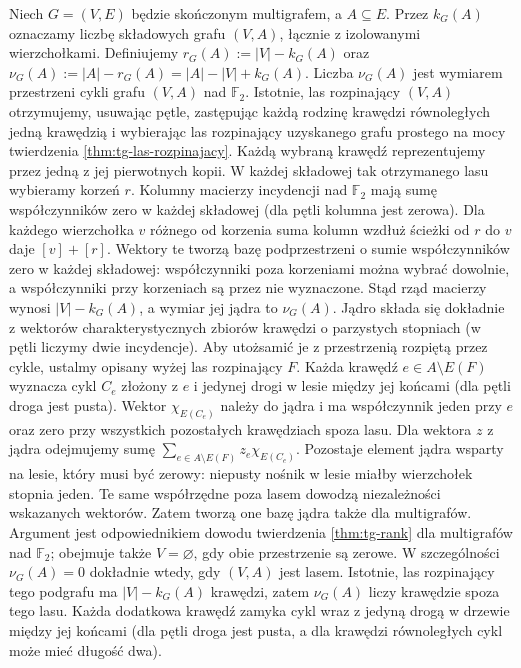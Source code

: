 \begin{definicja}
Niech $G=(V,E)$ będzie skończonym multigrafem, a $A\subseteq E$.
Przez $k_G(A)$ oznaczamy liczbę składowych grafu $(V,A)$,
łącznie z izolowanymi wierzchołkami. Definiujemy
$r_G(A):=|V|-k_G(A)$ oraz
$\nu_G(A):=|A|-r_G(A)=|A|-|V|+k_G(A)$.
Liczba $\nu_G(A)$ jest wymiarem przestrzeni cykli grafu $(V,A)$
nad $\mathbb F_2$. Istotnie, las rozpinający $(V,A)$
otrzymujemy, usuwając pętle, zastępując każdą rodzinę
krawędzi równoległych jedną krawędzią i wybierając las
rozpinający uzyskanego grafu prostego na mocy twierdzenia
\ref{thm:tg-las-rozpinajacy}. Każdą wybraną krawędź
reprezentujemy przez jedną z jej pierwotnych kopii.
W każdej składowej tak otrzymanego lasu wybieramy korzeń $r$. Kolumny macierzy
incydencji nad $\mathbb F_2$ mają sumę współczynników
zero w każdej składowej (dla pętli kolumna jest zerowa).
Dla każdego wierzchołka $v$ różnego od korzenia suma
kolumn wzdłuż ścieżki od $r$ do $v$ daje $[v]+[r]$.
Wektory te tworzą bazę podprzestrzeni o sumie
współczynników zero w każdej składowej: współczynniki
poza korzeniami można wybrać dowolnie, a współczynniki
przy korzeniach są przez nie wyznaczone.
Stąd rząd macierzy wynosi $|V|-k_G(A)$, a wymiar
jej jądra to $\nu_G(A)$. Jądro składa się dokładnie z wektorów
charakterystycznych zbiorów krawędzi o parzystych
stopniach (w pętli liczymy dwie incydencje).
Aby utożsamić je z przestrzenią rozpiętą przez cykle,
ustalmy opisany wyżej las rozpinający $F$.
Każda krawędź $e\in A\setminus E(F)$ wyznacza cykl
$C_e$ złożony z $e$ i jedynej drogi w lesie między
jej końcami (dla pętli droga jest pusta).
Wektor $\chi_{E(C_e)}$ należy do jądra i ma
współczynnik jeden przy $e$ oraz zero przy wszystkich
pozostałych krawędziach spoza lasu.
Dla wektora $z$ z jądra odejmujemy sumę
$\sum_{e\in A\setminus E(F)}z_e\chi_{E(C_e)}$.
Pozostaje element jądra wsparty na lesie,
który musi być zerowy: niepusty nośnik
w lesie miałby wierzchołek stopnia jeden.
Te same współrzędne poza lasem dowodzą niezależności
wskazanych wektorów. Zatem tworzą one bazę
jądra także dla multigrafów. Argument jest odpowiednikiem
dowodu twierdzenia \ref{thm:tg-rank} dla multigrafów
nad $\mathbb F_2$; obejmuje także $V=\varnothing$,
gdy obie przestrzenie są zerowe.
W szczególności $\nu_G(A)=0$ dokładnie wtedy, gdy
$(V,A)$ jest lasem. Istotnie, las rozpinający tego
podgrafu ma $|V|-k_G(A)$ krawędzi, zatem $\nu_G(A)$
liczy krawędzie spoza tego lasu. Każda dodatkowa
krawędź zamyka cykl wraz z jedyną drogą w drzewie
między jej końcami (dla pętli droga jest pusta,
a dla krawędzi równoległych cykl może mieć długość dwa).
\end{definicja}

